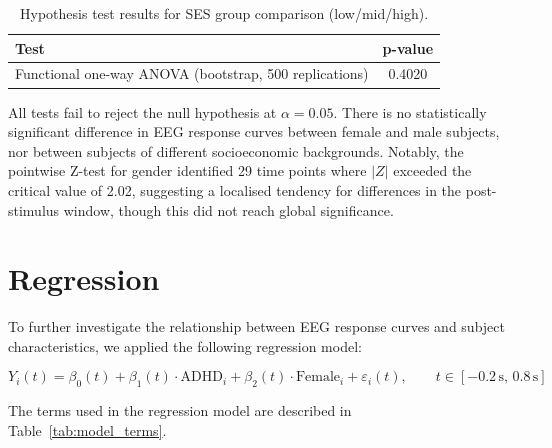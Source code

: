 \documentclass[twoside,11pt]{article}
\begin{document}
\begin{table}[ht]
  \centering
  \begin{tabular}{lc}
    \toprule
    \textbf{Test} & \textbf{p-value} \\
    \midrule
    Functional one-way ANOVA (bootstrap, 500 replications) & 0.4020 \\
    \bottomrule
  \end{tabular}
  \caption{Hypothesis test results for SES group comparison (low/mid/high).}
  \label{tab:ses_test}
\end{table}

All tests fail to reject the null hypothesis at $\alpha = 0.05$. There is no statistically
significant difference in EEG response curves between female and male subjects, nor between subjects
of different socioeconomic backgrounds. Notably, the pointwise Z-test for gender identified 29 time
points where $|Z|$ exceeded the critical value of 2.02, suggesting a localised tendency for
differences in the post-stimulus window, though this did not reach global significance.

\section{Regression}

To further investigate the relationship between EEG response curves and subject characteristics, we
applied the following regression model:

\begin{equation}
  Y_i(t) = \beta_0(t) + \beta_1(t) \cdot \text{ADHD}_i + \beta_2(t) \cdot \text{Female}_i +
  \varepsilon_i(t), \qquad t \in [-0.2\,\mathrm{s},\, 0.8\,\mathrm{s}]
\end{equation}

The terms used in the regression model are described in Table~\ref{tab:model_terms}.
\end{document}
